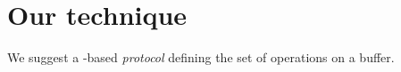 \section{Our technique}

We suggest a \clos{}-based \emph{protocol} defining the set of
operations on a buffer.
